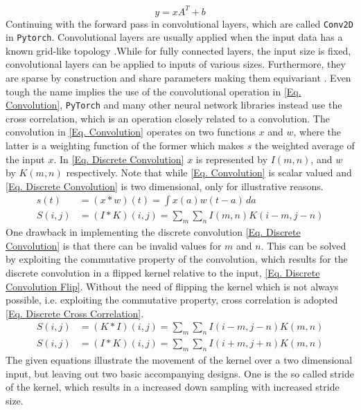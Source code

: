 \documentclass[12pt, a4paper]{article}
\begin{document}
\begin{equation}
	y = xA^T + b \label{Eq. Linear Transformation}
\end{equation}
Continuing with the forward pass in convolutional layers, which are called \texttt{Conv2D}\cite{bibid} in \texttt{Pytorch}. Convolutional layers are usually applied when the input data has a known grid-like topology \cite{Goodfellow}.While for fully connected layers, the input size is fixed, convolutional layers can be applied to inputs of various sizes. Furthermore, they are sparse by construction and share parameters making them equivariant \cite{Goodfellow}.  Even tough the name implies the use of the convolutional operation in \cref{Eq. Convolution}, \texttt{PyTorch} and many other neural network libraries instead use the cross correlation, which is an operation closely related to a convolution\cite{Goodfellow}\cite{Pytorch website}. The convolution in \ref{Eq. Convolution} operates on two functions \(x\) and \(w\), where the latter is a weighting function of the former which makes \(s\) the weighted average of the input \(x\). In \cref{Eq. Discrete Convolution} \(x\) is represented by \(I(m,n)\), and \(w\) by \(K(m,n)\) respectively. Note that while \cref{Eq. Convolution} is scalar valued and \cref{Eq. Discrete Convolution} is two dimensional, only for illustrative reasons. 
\begin{align}
	s(t) &= (x * w)(t) = \int x(a)w(t-a)\,da \label{Eq. Convolution}\\
	S(i,j) &= (I * K)(i,j) = \sum_{m}\sum_{n}I(m,n)K(i-m,j-n)
	\label{Eq. Discrete Convolution}
\end{align}
One drawback in implementing the discrete convolution \cref{Eq. Discrete Convolution} is that there can be invalid values for \(m\) and \(n\). This can be solved by exploiting the commutative property of the convolution, which results for the discrete convolution in a flipped kernel relative to the input, \cref{Eq. Discrete Convolution Flip}. Without the need of flipping the kernel which is not always possible, i.e. exploiting the commutative property, cross correlation is adopted \cref{Eq. Discrete Cross Correlation}.
\begin{align}
	S(i,j) &= (K * I)(i,j) = \sum_{m}\sum_{n}I(i-m,j-n)K(m,n) 
	\label{Eq. Discrete Convolution Flip}\\
	S(i,j) &= (I * K)(i,j) = \sum_{m}\sum_{n}I(i+m,j+n)K(m,n) 
	\label{Eq. Discrete Cross Correlation}
\end{align}
The given equations illustrate the movement of the kernel over a two dimensional input, but leaving out two basic accompanying designs. One is the so called stride of the kernel, which results in a increased down sampling with increased stride size. 
\end{document}
